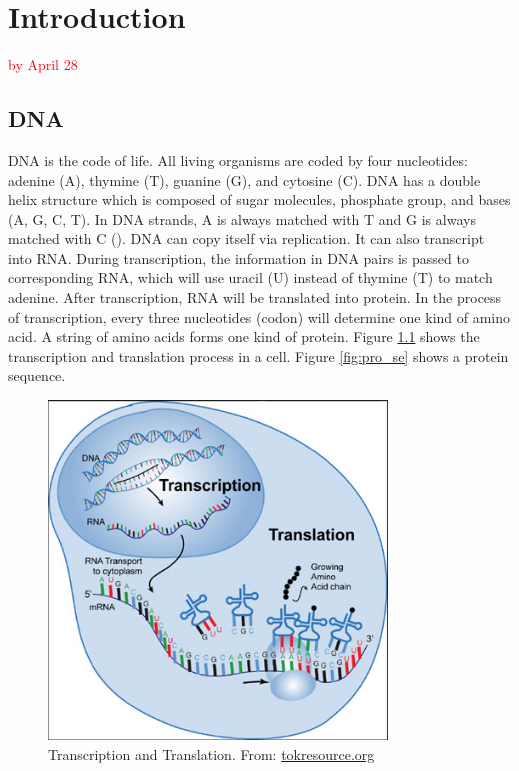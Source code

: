 \chapter{Introduction}
\textcolor{red}{by April 28}
\section{DNA}
DNA is the code of life. All living organisms are coded by four nucleotides: adenine (A), thymine (T), guanine (G), and cytosine (C). DNA has a double helix structure which is composed of sugar molecules, phosphate group, and bases (A, G, C, T). In DNA strands, A is always matched with T and G is always matched with C (\cite{jones2004introduction}).
DNA can copy itself via replication. It can also transcript into RNA. During transcription, the information in DNA pairs is passed 
to corresponding RNA, which will use uracil (U) instead of thymine (T) to match adenine. After transcription, RNA will be translated into protein. In the process of transcription, every three nucleotides (codon) will determine one kind of amino acid. A string of amino acids forms one kind of protein. Figure \ref{fig:trans_trans} shows the transcription and translation process in a cell. Figure \ref{fig:pro_se} shows a protein sequence.
\begin{figure}[!h]
\begin{center}
\includegraphics[height = 9cm, width = 9cm]{img/transcp_transla.jpg}
\caption{Transcription and Translation. From:  \href{http://www.tokresource.org}{tokresource.org}\label{fig:trans_trans}}
\end{center}
\end{figure}

